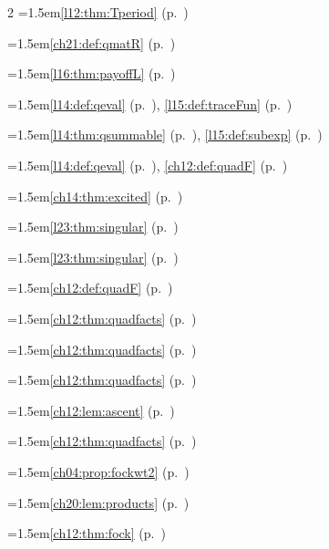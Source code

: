 \begin{multicols}{2}
\hangindent=1.5em\quad \ref{l12:thm:Tperiod} (p.~\pageref{l12:thm:Tperiod})\par
\hangindent=1.5em\quad \ref{ch21:def:qmatR} (p.~\pageref{ch21:def:qmatR})\par
\hangindent=1.5em\quad \ref{l16:thm:payoffL} (p.~\pageref{l16:thm:payoffL})\par
\hangindent=1.5em\quad \ref{l14:def:qeval} (p.~\pageref{l14:def:qeval}), \ref{l15:def:traceFun} (p.~\pageref{l15:def:traceFun})\par
\hangindent=1.5em\quad \ref{l14:thm:qsummable} (p.~\pageref{l14:thm:qsummable}), \ref{l15:def:subexp} (p.~\pageref{l15:def:subexp})\par
\hangindent=1.5em\quad \ref{l14:def:qeval} (p.~\pageref{l14:def:qeval}), \ref{ch12:def:quadF} (p.~\pageref{ch12:def:quadF})\par
\hangindent=1.5em\quad \ref{ch14:thm:excited} (p.~\pageref{ch14:thm:excited})\par
\hangindent=1.5em\quad \ref{l23:thm:singular} (p.~\pageref{l23:thm:singular})\par
\hangindent=1.5em\quad \ref{l23:thm:singular} (p.~\pageref{l23:thm:singular})\par
\hangindent=1.5em\quad \ref{ch12:def:quadF} (p.~\pageref{ch12:def:quadF})\par
\hangindent=1.5em\quad \ref{ch12:thm:quadfacts} (p.~\pageref{ch12:thm:quadfacts})\par
\hangindent=1.5em\quad \ref{ch12:thm:quadfacts} (p.~\pageref{ch12:thm:quadfacts})\par
\hangindent=1.5em\quad \ref{ch12:thm:quadfacts} (p.~\pageref{ch12:thm:quadfacts})\par
\hangindent=1.5em\quad \ref{ch12:lem:ascent} (p.~\pageref{ch12:lem:ascent})\par
\hangindent=1.5em\quad \ref{ch12:thm:quadfacts} (p.~\pageref{ch12:thm:quadfacts})\par
\hangindent=1.5em\quad \ref{ch04:prop:fockwt2} (p.~\pageref{ch04:prop:fockwt2})\par
\hangindent=1.5em\quad \ref{ch20:lem:products} (p.~\pageref{ch20:lem:products})\par
\hangindent=1.5em\quad \ref{ch12:thm:fock} (p.~\pageref{ch12:thm:fock})\par

\end{multicols}
